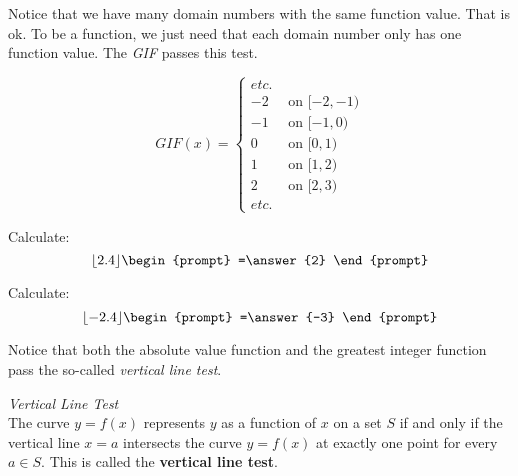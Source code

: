 \documentclass{ximera}
\begin{document}
Notice that we have many domain numbers with the same function value. That is ok. To be a function, we just need that each domain number only has one function value.  The \textit{GIF} passes this test.






\[
GIF(x) = 
\begin{cases}
   etc. &    \\
  -2 & \text{ on } [-2, -1) \\
  -1 & \text{ on } [-1, 0) \\ 
   0 & \text{ on } [0, 1) \\
  1 & \text{ on } [1, 2) \\
   2 & \text{ on } [2, 3) \\
  etc. &  
\end{cases}
\]





\begin{question}
  Calculate:
  \[
  \lfloor 2.4 \rfloor
  \begin{prompt}
    =\answer{2}
  \end{prompt}
  \]
  \end{question}

  \begin{question}
  Calculate:
  \[
  \lfloor -2.4 \rfloor
  \begin{prompt}
    =\answer{-3}
  \end{prompt}
  \]
\end{question}





Notice that both the absolute value function and the greatest integer function pass the so-called \textit{vertical line test}.

\begin{theorem} \textit{Vertical Line Test} \\
The curve $y=f(x)$ represents $y$ as a function of $x$ on a set $S$ if and only if the vertical line $x=a$ intersects the curve $y=f(x)$ at exactly one point for every $a \in S$. This is called the \textbf{vertical line test}.
\end{theorem}
\end{document}
